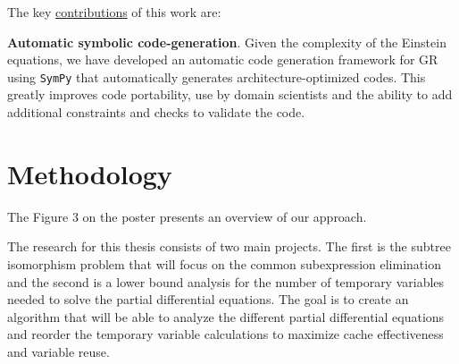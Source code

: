 \documentclass[10pt, conference]{IEEEtran} %
\begin{document}
\noindent The key \ul{contributions} of this work are:

\vspace{0.1in}    
\noindent \textbf{Automatic symbolic code-generation}. Given the complexity of the Einstein equations, we have developed an automatic code generation framework for GR using \texttt{SymPy} that automatically generates architecture-optimized codes. This greatly improves code portability, use by domain scientists and the ability to add additional constraints and checks to validate the code.


\section{Methodology}
The Figure 3 on the poster presents an overview of our approach. 
\vspace{-0.15in}




The research for this thesis consists of two main projects. The first is the subtree isomorphism problem that will focus on the common subexpression elimination and the second is a lower bound analysis for the number of temporary variables needed to solve the partial differential equations. The goal is to create an algorithm that will be able to analyze the different partial differential equations and reorder the temporary variable calculations to maximize cache effectiveness and variable reuse. 
\end{document}
